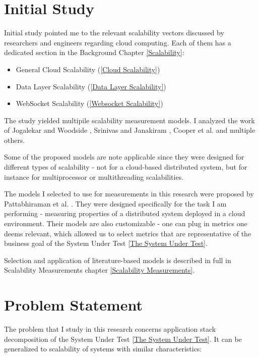 \documentclass{uvamscse}
\begin{document}
\section{Initial Study}

Initial study pointed me to the relevant scalability vectors discussed by researchers and engineers regarding cloud computing. Each of them has a dedicated section in the Background Chapter \ref{Scalability}:

\begin{itemize}
  \item General Cloud Scalability (\ref{Cloud Scalability})
  \item Data Layer Scalability (\ref{Data Layer Scalability})
  \item WebSocket Scalability (\ref{Websocket Scalability})
\end{itemize}

The study yielded multipile scalability measurement models. I analyzed the work of Jogalekar and Woodside \cite{EvaScaDS}, Srinivas and Janakiram \cite{SriJan}, Cooper et al. \cite{Ycsb} and multiple others.

Some of the proposed models are note applicable since they were designed for different types of scalability - not for a cloud-based distributed system, but for instance for multiprocessor or multithreading scalabilities.

The models I selected to use for measurements in this research were proposed by Pattabhiraman et al. \cite{Models}. They were designed specifically for the task I am performing - measuring properties of a distributed system deployed in a cloud environment. Their models are also customizable - one can plug in metrics one deems relevant, which allowed us to select metrics that are representative of the business goal of the System Under Test \ref{The System Under Test}.

Selection and application of literature-based models is described in full in Scalability Measurements chapter \ref{Scalability Measurements}.

\section{Problem Statement}\label{Problem Statement}

The problem that I study in this research concerns application stack decomposition of the System Under Test \ref{The System Under Test}. It can be generalized to scalability of systems with similar characteristics:
\end{document}
